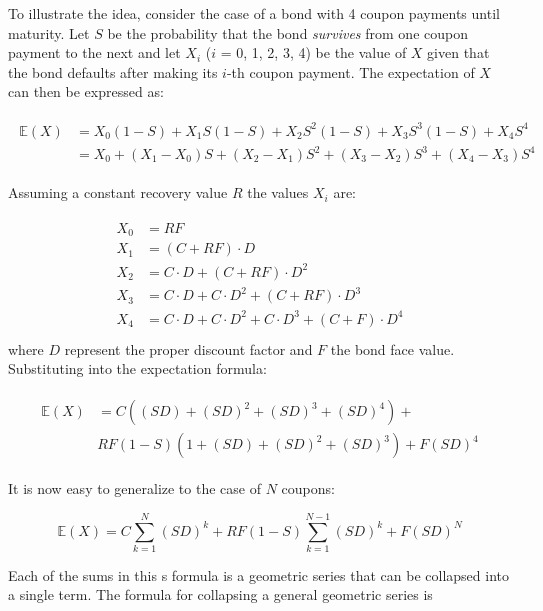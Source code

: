 {To illustrate the idea, consider the case of a bond with 4 coupon payments
until maturity. Let $S$ be the probability that the bond \emph{survives} from one
coupon payment to the next and let $X_i$ ($i$ = 0, 1, 2, 3, 4) be the value of
$X$ given that the bond defaults after making its $i$-th coupon payment. 
The expectation of $X$ can then be expressed as:

\begin{align}
\begin{split}
\mathbb{E}(X) &= X_0(1-S) + X_1 S(1-S) + X_2 S^2 (1-S) + X_3 S^3 (1-S) + X_4 S^4 \\
&= X_0 + (X_1 - X_0)S + (X_2 - X_1)S^2 + (X_3 - X_2)S^3 + (X_4 - X_3)S^4
\end{split}
\end{align}

Assuming a constant recovery value $R$ the values $X_i$ are:

\begin{align}
\begin{split}
X_0 &= RF \\
X_1 &= (C + RF)\cdot D \\
X_2 &= C\cdot D + (C + RF)\cdot D^2 \\
X_3 &= C\cdot D + C\cdot D^2 + (C + RF)\cdot D^3 \\
X_4 &= C\cdot D + C\cdot D^2 + C\cdot D^3 + (C + F)\cdot D^4 \\
\end{split}
\end{align}
where $D$ represent the proper discount factor and $F$ the bond face value.
Substituting into the expectation formula:

\begin{align}
\begin{split}
\mathbb{E}(X) &= C((SD) + (SD)^2 + (SD)^3 + (SD)^4) + \\
&RF(1-S)(1+(SD)+(SD)^2 + (SD)^3) + F(SD)^4 
\end{split}
\end{align}

It is now easy to generalize to the case of $N$ coupons:

\begin{equation} \mathbb{E}(X) = C \sum_{k=1}^{N}{(SD)^k} + RF(1-S)\sum_{k=1}^{N-1}{(SD)^k} + F(SD)^N \end{equation}

Each of the sums in this s formula is a geometric series that can be collapsed
into a single term. The formula for collapsing a general geometric series is 

}
